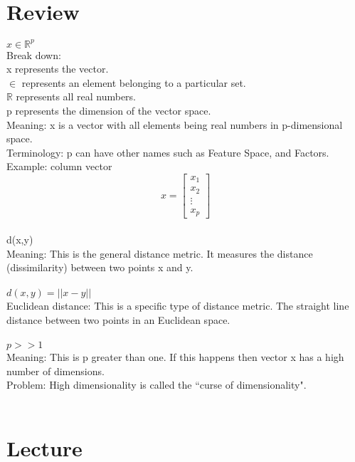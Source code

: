 \section{Review}
$x \in {\mathbb{R}}^p$ \\
Break down: \\
\hspace*{1cm} x represents the vector. \\
\hspace*{1cm} $\in$ represents an element belonging to a particular set. \\
\hspace*{1cm} $\mathbb{R}$ represents all real numbers. \\
\hspace*{1cm} p represents the dimension of the vector space. \\
Meaning: x is a vector with all elements being real numbers in p-dimensional space. \\
Terminology: p can have other names such as Feature Space, and Factors. \\
Example: column vector\\
\[
x= \begin{bmatrix}
x_1 \\
x_2 \\
\vdots \\
x_p
\end{bmatrix}
\] \\
d(x,y) \\
Meaning: This is the general distance metric. It measures the distance (dissimilarity) between two points x and y. \\\\
$d(x,y) = ||x-y||$ \\
Euclidean distance: This is a specific type of distance metric. The straight line distance between two points in an Euclidean space. \\\\
$p>>1$ \\ 
Meaning: This is p  greater than one. If this happens then vector x has a high number of dimensions. \\
Problem: High dimensionality is called the ``curse of dimensionality". \\\\

\section{Lecture}
